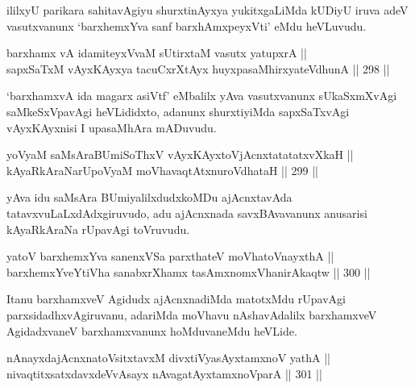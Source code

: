 \begin{artha}
ililxyU parikara sahitavAgiyu shurxtinAyxya yukitxgaLiMda kUDiyU iruva
adeV vasutxvanunx `barxhemxYva sanf barxhAmxpeyxVti' eMdu heVLuvudu.
\end{artha}

\begin{shl}
barxhamx vA idamiteyxVvaM sUtirxtaM vasutx yatupxrA || \\
sapxSaTxM vAyxKAyxya tacuCxrXtAyx huyxpasaMhirxyateV\s dhunA \hfill || 298 ||  
\end{shl}

\begin{artha}
`barxhamxvA ida magarx asiVtf' eMbalilx yAva vasutxvanunx sUkaSxmXvAgi
saMkeSxVpavAgi heVLididxto, adanunx shurxtiyiMda sapxSaTxvAgi
vAyxKAyxnisi I upasaMhAra mADuvudu.
\end{artha}


\begin{shl}
yoV\s yaM saMsAraBUmiSoThxV vAyxKAyxtoV\s jAcnxtatatatxvXkaH || \\
kAyaRkAraNarUpoV\s yaM moVhavaqtAtxnuroVdhataH \hfill || 299 ||  
\end{shl}

\begin{artha}
yAva idu saMsAra BUmiyalilxdudxkoMDu ajAcnxtavAda
tatavxvuLaLxdAdxgiruvudo, adu ajAcnxnada savxBAvavanunx anusarisi
kAyaRkAraNa rUpavAgi toVruvudu.
\end{artha}

\begin{shl}
yatoV barxhemxYva sanenxVSa parxthateV moVhatoV\s nayxthA || \\
barxhemxYveYtiVha sanabxrXhamx tasAmxnomxVhanirAkaqtw \hfill || 300 ||  
\end{shl}

\begin{artha}
Itanu barxhamxveV Agidudx ajAcnxnadiMda matotxMdu rUpavAgi
parxsidadhxvAgiruvanu, adariMda moVhavu nAshavAdalilx barxhamxveV
AgidadxvaneV barxhamxvanunx hoMduvaneMdu heVLide.
\end{artha}

\begin{shl}
nAnayxdajAcnxnatoV\s sitxtavxM divxtiVyasAyx\s \s tamxnoV yathA || \\
nivaqtitxsatxdavxdeVvAsayx nAvagatAyxtamxnoV\s parA \hfill || 301 ||  
\end{shl}

